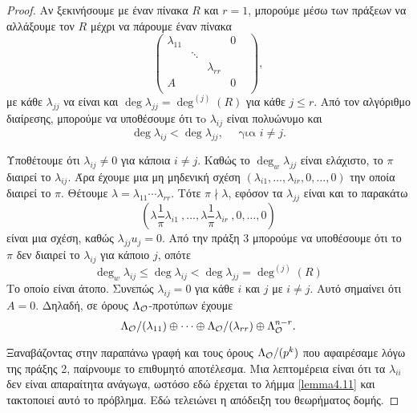 \begin{proof}
\noindent Αν ξεκινήσουμε με έναν πίνακα $R$ και $r=1$, μπορούμε μέσω των πράξεων να αλλάξουμε τον $R$ μέχρι να πάρουμε έναν πίνακα
$$\begin{pmatrix}
    \lambda_{11} & & & 0 \\ 
    & \ddots & & & \\
    & & \lambda_{rr} &  \\
    A & & & 0 \\
\end{pmatrix},$$
με κάθε $\lambda_{jj}$ να είναι  και $\deg\lambda_{jj} = \deg^{(j)}(R)$ για κάθε $j\leq r$. Από τον αλγόριθμο διαίρεσης, μπορούμε να υποθέσουμε ότι τo $\lambda_{ij}$ είναι πολυώνυμο και 
$$\deg \lambda_{ij} < \deg \lambda_{jj}, \quad \text{ για } i \neq j.$$

\noindent Υποθέτουμε ότι $\lambda_{ij}\neq 0$ για κάποια $i\neq j$. Καθώς το $\deg_w \lambda_{jj}$ είναι ελάχιστο, το $\pi$ διαιρεί το $\lambda_{ij}$. Άρα έχουμε μια μη μηδενική σχέση $(\lambda_{i1},\ldots, \lambda_{ir},0,\ldots,0)$ την οποία διαιρεί το $\pi$. Θέτουμε $\lambda = \lambda_{11}\cdots \lambda_{rr}$. Τότε $\pi \nmid \lambda$, εφόσον τα $\lambda_{jj}$ είναι  και το παρακάτω
$$\left(\lambda \frac{1}{\pi} \lambda_{i1} \ ,\ldots, \lambda\frac{1}{\pi} \lambda_{ir} \ , 0 ,\ldots , 0 \right)$$ είναι μια σχέση, 
καθώς $\lambda_{jj} u _j = 0$. Από την πράξη 3 μπορούμε να υποθέσουμε ότι το $\pi$ δεν διαιρεί το $\lambda_{ij}$ για κάποιο $j$, οπότε
$$\deg_w \lambda_{ij} \leq \deg \lambda_{ij} < \deg \lambda_{jj} = \deg^{(j)}(R)$$
Το οποίο είναι άτοπο. Συνεπώς $\lambda_{ij}=0$ για κάθε $i$ και $j$ με $i\neq j$. Αυτό σημαίνει ότι $A=0$. Δηλαδή, σε όρους $\Lambda_\mathcal{O}$-προτύπων έχουμε
$$\Lambda_\mathcal{O}/(\lambda_{11}) \oplus \cdots \oplus \Lambda_\mathcal{O} /(\lambda_{rr}) \oplus \Lambda_\mathcal{O}^{n-r}.$$

\noindent Ξαναβάζοντας στην παραπάνω γραφή και τους όρους $\Lambda_\mathcal{O}/(p^k)$ που αφαιρέσαμε λόγω της πράξης 2, παίρνουμε το επιθυμητό αποτέλεσμα. Μια λεπτομέρεια είναι ότι τα $\lambda_{ii}$ δεν είναι απαραίτητα ανάγωγα, ωστόσο εδώ έρχεται το λήμμα \ref{lemma4.11} και τακτοποιεί αυτό το πρόβλημα. Εδώ τελειώνει η απόδειξη του θεωρήματος δομής.
\end{proof}